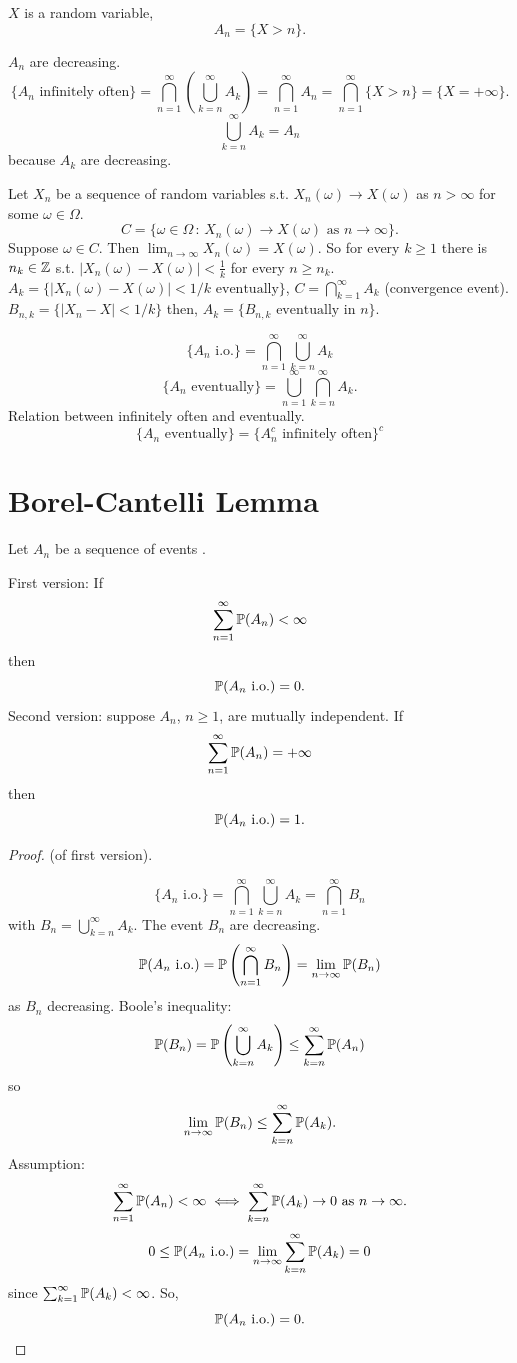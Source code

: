 \documentclass[10pt, a4paper]{article}
\begin{document}
\begin{example}
    $X$ is a random variable,
    \[
    A_n = \{X > n\}.
    \]

    $A_n$ are decreasing.
    \[
    \{A_n\text{ infinitely often}\} = \bigcap_{n = 1}^{\infty}\left(\bigcup_{k = n}^{\infty}A_k\right) = \bigcap_{n = 1}^{\infty}A_n = \bigcap_{n = 1}^{\infty}\{X > n\} = \{X = +\infty\}.
    \]
    \[
    \bigcup_{k = n}^{\infty}A_k =  A_n
    \]
    because $A_k$ are decreasing.
\end{example}

\begin{example}
    Let $X_n$ be a sequence of random variables s.t. $X_n(\omega) \to X(\omega)$ as $n > \infty$ for some $\omega \in \Omega$.
    \[
    C = \{\omega \in \Omega\,:\, X_n(\omega) \to X(\omega)\text{ as } n \to \infty\}.
    \]
    Suppose $\omega \in C$.
    Then $\lim_{n \to \infty}X_n(\omega) = X(\omega)$.
    So for every $k \geq 1$ there is $n_k \in \Z$ s.t. $|X_n(\omega) - X(\omega)| < \frac{1}{k}$ for every $n \geq n_k$.
    $A_k = \{|X_n(\omega) - X(\omega)| < 1 / k\text{ eventually}\}$,
    $C = \bigcap_{k = 1}^{\infty}A_k$
    (convergence event).
    $B_{n, k} = \{|X_n - X| < 1 / k\}$ then,
    $A_k = \{B_{n, k}\text{ eventually in } n\}$.
\end{example}

\[
\{A_n\text{ i.o.}\} = \bigcap_{n = 1}^{\infty}\bigcup_{k = n}^{\infty}A_k
\]
\[
\{A_n\text{ eventually}\} = \bigcup_{n = 1}^{\infty}\bigcap_{k = n}^{\infty}A_k.
\]
Relation between infinitely often and eventually.
\[
\{A_n\text{ eventually}\} = \{A_n ^ c\text{ infinitely often}\} ^ c
\]

\newpage

\section{Borel-Cantelli Lemma}
Let $A_n$ be a sequence of events .

First version:
If
\[
\sum_{n = 1}^{\infty}\P(A_n) < \infty
\]
then
\[
\P(A_n\text{ i.o.}) = 0.
\]
Second version:
suppose $A_n$,
$n \geq 1$,
are mutually independent.
If
\[
\sum_{n = 1}^{\infty}\P(A_n) = +\infty
\]
then
\[
\P(A_n\text{ i.o.}) = 1.
\]
\begin{proof}
    (of first version).

    \[
    \{A_n\text{ i.o.}\} = \bigcap_{n = 1}^{\infty}\bigcup_{k = n}^{\infty}A_k = \bigcap_{n = 1}^{\infty}B_n
    \]
    with $B_n = \bigcup_{k = n}^{\infty}A_k$.
    The event $B_n$ are decreasing.
    \[
    \P(A_n\text{ i.o.}) = \P\left(\bigcap_{n = 1}^{\infty}B_n\right) = \lim_{n \to \infty}\P(B_n)
    \]
    as $B_n$ decreasing.
    Boole's inequality:
    \[
    \P(B_n) = \P\left(\bigcup_{k = n}^{\infty}A_k\right) \leq \sum_{k = n}^{\infty}\P(A_n)
    \]
    so
    \[
    \lim_{n \to \infty}\P(B_n) \leq \sum_{k = n}^{\infty}\P(A_k).
    \]
    Assumption:
    \[
    \sum_{n = 1}^{\infty}\P(A_n) < \infty \iff \sum_{k = n}^{\infty}\P(A_k) \to 0\text{ as } n \to \infty.
    \]
    \[
    0 \leq \P(A_n\text{ i.o.}) = \lim_{n \to \infty}\sum_{k = n}^{\infty}\P(A_k) = 0
    \]
    since $\sum_{k = 1}^{\infty}\P(A_k) < \infty$.
    So,
    \[
    \P(A_n\text{ i.o.}) = 0.
    \]
\end{proof}
\end{document}
